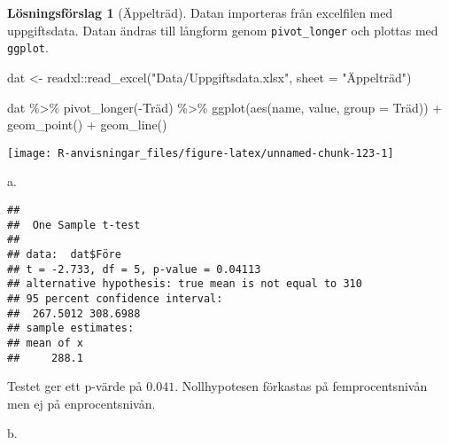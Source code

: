 \documentclass[
]{book}
\newenvironment{Shaded}{\begin{snugshade}}{\end{snugshade}}
\newcommand{\AttributeTok}[1]{\textcolor[rgb]{0.77,0.63,0.00}{#1}}
\newcommand{\DecValTok}[1]{\textcolor[rgb]{0.00,0.00,0.81}{#1}}
\newcommand{\FunctionTok}[1]{\textcolor[rgb]{0.00,0.00,0.00}{#1}}
\newcommand{\NormalTok}[1]{#1}
\newcommand{\OtherTok}[1]{\textcolor[rgb]{0.56,0.35,0.01}{#1}}
\newcommand{\SpecialCharTok}[1]{\textcolor[rgb]{0.00,0.00,0.00}{#1}}
\newcommand{\StringTok}[1]{\textcolor[rgb]{0.31,0.60,0.02}{#1}}
\theoremstyle{definition}
\theoremstyle{definition}
\theoremstyle{definition}
\theoremstyle{definition}
\newtheorem{hypothesis}{Lösningsförslag}[chapter]
\theoremstyle{remark}
\begin{document}
\begin{hypothesis}[Äppelträd]
Datan importeras från excelfilen med uppgiftsdata. Datan ändras till långform genom \texttt{pivot\_longer} och plottas med \texttt{ggplot}.

\begin{Shaded}
\begin{Highlighting}[]
\NormalTok{dat }\OtherTok{\textless{}{-}}\NormalTok{ readxl}\SpecialCharTok{::}\FunctionTok{read\_excel}\NormalTok{(}\StringTok{"Data/Uppgiftsdata.xlsx"}\NormalTok{, }\AttributeTok{sheet =} \StringTok{"Äppelträd"}\NormalTok{)}

\NormalTok{dat }\SpecialCharTok{\%\textgreater{}\%} 
  \FunctionTok{pivot\_longer}\NormalTok{(}\SpecialCharTok{{-}}\NormalTok{Träd) }\SpecialCharTok{\%\textgreater{}\%} 
  \FunctionTok{ggplot}\NormalTok{(}\FunctionTok{aes}\NormalTok{(name, value, }\AttributeTok{group =}\NormalTok{ Träd)) }\SpecialCharTok{+}
  \FunctionTok{geom\_point}\NormalTok{() }\SpecialCharTok{+}
  \FunctionTok{geom\_line}\NormalTok{()}
\end{Highlighting}
\end{Shaded}

\begin{center}\texttt{[image: R-anvisningar\_files/figure-latex/unnamed-chunk-123-1]} \end{center}

a.

\begin{Shaded}
\end{Shaded}

\begin{verbatim}
## 
##  One Sample t-test
## 
## data:  dat$Före
## t = -2.733, df = 5, p-value = 0.04113
## alternative hypothesis: true mean is not equal to 310
## 95 percent confidence interval:
##  267.5012 308.6988
## sample estimates:
## mean of x 
##     288.1
\end{verbatim}

Testet ger ett p-värde på \(0.041\). Nollhypotesen förkastas på femprocentsnivån men ej på enprocentsnivån.

b.

\begin{Shaded}
\end{Shaded}


\end{hypothesis}
\end{document}
